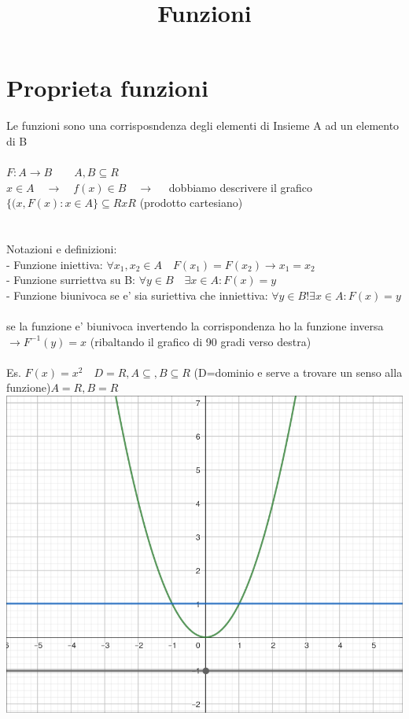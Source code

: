 \documentclass{article}
\title{Funzioni}
\begin{document}
\section{Proprieta funzioni}
Le funzioni sono una corrisposndenza degli elementi di Insieme A ad un elemento di B\\
\\
$F: A \to B \quad \quad A,B \subseteq R$\\

$x \in A \quad \to \quad f(x) \in B \quad \to \quad $ dobbiamo descrivere il grafico\\

$\{ (x,F(x): x \in A \} \subseteq R x R$ (prodotto cartesiano)\\
\\
\\
Notazioni e definizioni:\\
- Funzione iniettiva: $\forall x_{1},x_{2} \in A \quad F(x_{1})=F(x_{2}) \to x_{1}=x_{2}$\\
- Funzione surriettva su B: $\forall y \in B \quad \exists x \in A :F(x)=y$\\
- Funzione biunivoca se e' sia suriettiva che inniettiva: $\forall y \in B !\exists x \in A:F(x)=y$\\
\\
se la funzione e' biunivoca invertendo la corrispondenza ho la funzione inversa $\to F^{-1}(y)=x$ (ribaltando il grafico di 90 gradi verso destra)\\
\\
Es. $F(x)=x^{2} \quad D=R, A \subseteq, B \subseteq R$ (D=dominio e serve a trovare un senso alla funzione)$A=R, B=R$\\
\includegraphics{1-Lezione-2-esempio.png}
\end{document}
